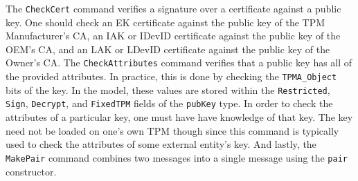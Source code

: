 The \verb|CheckCert| command verifies a signature over a certificate against a public key. One should check an EK certificate against the public key of the TPM Manufacturer's CA, an IAK or IDevID certificate against the public key of the OEM's CA, and an LAK or LDevID certificate against the public key of the Owner's CA.
The \verb|CheckAttributes| command verifies that a public key has all of the provided attributes. In practice, this is done by checking the \verb|TPMA_Object|  bits of the key. In the model, these values are stored within the \verb|Restricted|, \verb|Sign|, \verb|Decrypt|, and \verb|FixedTPM| fields of the \verb|pubKey| type. In order to check the attributes of a particular key, one must have have knowledge of that key. The key need not be loaded on one's own TPM though since this command is typically used to check the attributes of some external entity's key. And lastly, the \verb|MakePair| command combines two messages into a single message using the \verb|pair| constructor.














